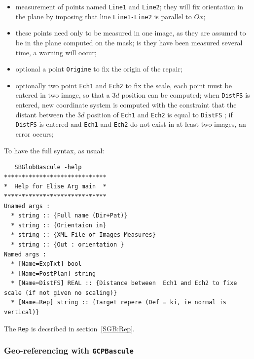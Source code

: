 \begin{itemize}
   \item measurement of points named {\tt Line1} and  {\tt Line2};
         they will fix orientation in the plane by imposing that line
           {\tt Line1-Line2} is parallel to $Ox$;

   \item these points need only to be measured in one image, as they are
         assumed  to be in the plane  computed on the mask; is they have been
         measured several time, a warning will occur;

   \item optional a point {\tt Origine} to fix the origin of the repair;

   \item optionally two point {\tt Ech1} and {\tt Ech2} to fix the scale,
         each point must be entered in two image, so that a $3d$ position
         can be computed; when {\tt DistFS} is entered, new coordinate system
         is computed with the constraint that the distant between the $3d$  
         position of  {\tt Ech1} and {\tt Ech2} is equal to {\tt DistFS} ;
         if {\tt DistFS} is entered and {\tt Ech1} and {\tt Ech2} do not
         exist in at least two images, an error occurs;
\end{itemize}

To have the full syntax, as usual:

\begin{verbatim}
   SBGlobBascule -help
*****************************
*  Help for Elise Arg main  *
*****************************
Unamed args : 
  * string :: {Full name (Dir+Pat)}
  * string :: {Orientaion in}
  * string :: {XML File of Images Measures}
  * string :: {Out : orientation }
Named args : 
  * [Name=ExpTxt] bool
  * [Name=PostPlan] string
  * [Name=DistFS] REAL :: {Distance between  Ech1 and Ech2 to fixe scale (if not given no scaling)}
  * [Name=Rep] string :: {Target repere (Def = ki, ie normal is vertical)}
\end{verbatim}

The {\tt Rep} is decsribed in section~\ref{SGB:Rep}.


\subsubsection{Geo-referencing with {\tt GCPBascule}}

\label{Sec:GCPBascule}


